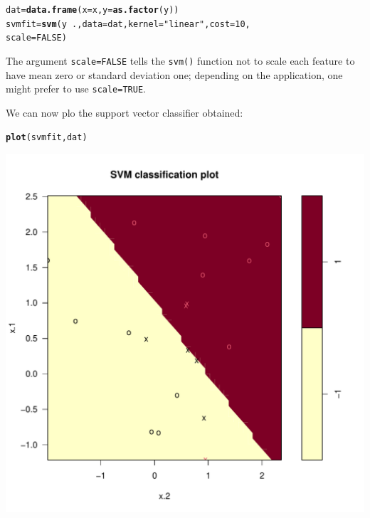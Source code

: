 \documentclass[12pt]{article}\usepackage[]{graphicx}\usepackage[]{color}
\makeatletter
\def\maxwidth{ %
  \ifdim\Gin@nat@width>\linewidth
    \linewidth
  \else
    \Gin@nat@width
  \fi
}
\newcommand{\hlnum}[1]{\textcolor[rgb]{0.686,0.059,0.569}{#1}}%
\newcommand{\hlstr}[1]{\textcolor[rgb]{0.192,0.494,0.8}{#1}}%
\newcommand{\hlopt}[1]{\textcolor[rgb]{0,0,0}{#1}}%
\newcommand{\hlstd}[1]{\textcolor[rgb]{0.345,0.345,0.345}{#1}}%
\newcommand{\hlkwb}[1]{\textcolor[rgb]{0.69,0.353,0.396}{#1}}%
\newcommand{\hlkwc}[1]{\textcolor[rgb]{0.333,0.667,0.333}{#1}}%
\newcommand{\hlkwd}[1]{\textcolor[rgb]{0.737,0.353,0.396}{\textbf{#1}}}%
\newenvironment{kframe}{%
 \def\at@end@of@kframe{}%
 \ifinner\ifhmode%
  \def\at@end@of@kframe{\end{minipage}}%
  \begin{minipage}{\columnwidth}%
 \fi\fi%
 \def\FrameCommand##1{\hskip\@totalleftmargin \hskip-\fboxsep
 \colorbox{shadecolor}{##1}\hskip-\fboxsep
     \hskip-\linewidth \hskip-\@totalleftmargin \hskip\columnwidth}%
 \MakeFramed {\advance\hsize-\width
   \@totalleftmargin\z@ \linewidth\hsize
   \@setminipage}}%
 {\par\unskip\endMakeFramed%
 \at@end@of@kframe}
\newenvironment{knitrout}{}{} %
\makeatother
\begin{document}
\begin{knitrout}
\color{fgcolor}\begin{kframe}
\begin{alltt}
\hlstd{dat} \hlkwb{=} \hlkwd{data.frame}\hlstd{(}\hlkwc{x}\hlstd{=x,} \hlkwc{y}\hlstd{=}\hlkwd{as.factor}\hlstd{(y))}
\hlstd{svmfit}\hlkwb{=}\hlkwd{svm}\hlstd{(y}\hlopt{~}\hlstd{.,} \hlkwc{data}\hlstd{=dat,} \hlkwc{kernel}\hlstd{=}\hlstr{"linear"}\hlstd{,} \hlkwc{cost}\hlstd{=}\hlnum{10}\hlstd{,}
           \hlkwc{scale}\hlstd{=}\hlnum{FALSE}\hlstd{)}
\end{alltt}
\end{kframe}
\end{knitrout}

The argument \texttt{scale=FALSE} tells the \texttt{svm()} function not to scale each feature to have mean zero or standard deviation one; depending on the application, one might prefer to use \texttt{scale=TRUE}.

We can now plo the support vector classifier obtained:

\begin{knitrout}
\color{fgcolor}\begin{kframe}
\begin{alltt}
\hlkwd{plot}\hlstd{(svmfit, dat)}
\end{alltt}
\end{kframe}
\includegraphics[width=\maxwidth]{figure/unnamed-chunk-4-1} 

\end{knitrout}
\end{document}
